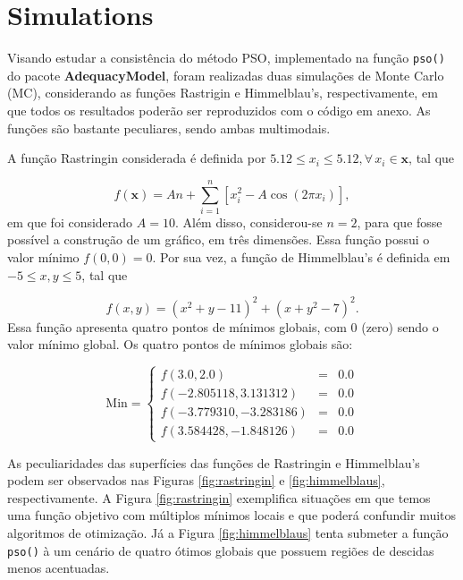 \documentclass[10pt,letterpaper]{article}
\begin{document}
\section{Simulations}
Visando estudar a consistência do método PSO, implementado na função \texttt{pso()} do pacote \textbf{AdequacyModel}, foram realizadas duas simulações de Monte Carlo (MC), considerando as funções Rastrigin e Himmelblau's, respectivamente, em que todos os resultados poderão ser reproduzidos com o código em anexo. As funções são bastante peculiares, sendo ambas multimodais.

A função Rastringin considerada é definida por $5.12 \leq x_i \leq 5.12, \forall\, x_i \in \bm{x}$, tal que

\begin{equation}
f(\bm{x}) = An + \sum_{i = 1}^{n} [x_i^2 - A\cos(2\pi x_i) ],
\label{eq:rastringin}
\end{equation}
em que foi considerado $A = 10$. Além disso, considerou-se $n = 2$, para que fosse possível a construção de um gráfico, em três dimensões. Essa função possui o valor mínimo $f(0, 0) = 0$. Por sua vez, a função de  Himmelblau's é definida em $-5 \leq x,y \leq 5$, tal que

\begin{equation}
f(x, y) = (x^2 + y -11)^2 + (x + y^2 - 7)^2.
\label{eq:himmelblaus}
\end{equation}
Essa função apresenta quatro pontos de mínimos globais, com 0 (zero) sendo o valor mínimo global. Os quatro pontos de mínimos globais são:

$$
\mathrm{Min} = \left \{
\begin{array}{rcc}
f(3.0, 2.0) & = & 0.0 \\
f(-2.805118, 3.131312) & = & 0.0 \\
f(-3.779310, -3.283186) & = & 0.0 \\
f(3.584428, -1.848126) & = & 0.0
\end{array} 
\right.
$$

As peculiaridades das superfícies das funções de Rastringin e Himmelblau's podem ser observados nas Figuras \ref{fig:rastringin} e \ref{fig:himmelblaus}, respectivamente. A Figura \ref{fig:rastringin} exemplifica situações em que temos uma função objetivo com múltiplos mínimos locais e que poderá confundir muitos algoritmos de otimização. Já a Figura \ref{fig:himmelblaus} tenta submeter a função \texttt{pso()} à um cenário de quatro ótimos globais que possuem regiões de descidas menos acentuadas.
\end{document}
